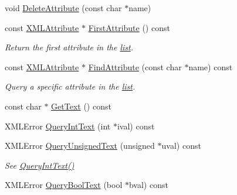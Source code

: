 \begin{DoxyCompactItemize}
void \hyperlink{classtinyxml2_1_1XMLElement_aebd45aa7118964c30b32fe12e944628a}{Delete\+Attribute} (const char $\ast$name)
\item 
\mbox{\label{classtinyxml2_1_1XMLElement_a3e191704c8d499906ec11fe2f60c6686}} 
const \hyperlink{classtinyxml2_1_1XMLAttribute}{X\+M\+L\+Attribute} $\ast$ \hyperlink{classtinyxml2_1_1XMLElement_a3e191704c8d499906ec11fe2f60c6686}{First\+Attribute} () const
\begin{DoxyCompactList}\small\item\em Return the first attribute in the \hyperlink{protocollist-p}{list}. \end{DoxyCompactList}\item 
\mbox{\label{classtinyxml2_1_1XMLElement_a2dcd4d5d6fb63396cd2f257c318b42c4}} 
const \hyperlink{classtinyxml2_1_1XMLAttribute}{X\+M\+L\+Attribute} $\ast$ \hyperlink{classtinyxml2_1_1XMLElement_a2dcd4d5d6fb63396cd2f257c318b42c4}{Find\+Attribute} (const char $\ast$name) const
\begin{DoxyCompactList}\small\item\em Query a specific attribute in the \hyperlink{protocollist-p}{list}. \end{DoxyCompactList}\item 
const char $\ast$ \hyperlink{classtinyxml2_1_1XMLElement_a6d5c8d115561ade4e4456b71d91b6f51}{Get\+Text} () const
\item 
X\+M\+L\+Error \hyperlink{classtinyxml2_1_1XMLElement_a926357996bef633cb736e1a558419632}{Query\+Int\+Text} (int $\ast$ival) const
\item 
\mbox{\label{classtinyxml2_1_1XMLElement_a14d38aa4b5e18a46274a27425188a6a1}} 
X\+M\+L\+Error \hyperlink{classtinyxml2_1_1XMLElement_a14d38aa4b5e18a46274a27425188a6a1}{Query\+Unsigned\+Text} (unsigned $\ast$uval) const
\begin{DoxyCompactList}\small\item\em See \hyperlink{classtinyxml2_1_1XMLElement_a926357996bef633cb736e1a558419632}{Query\+Int\+Text()} \end{DoxyCompactList}\item 
\mbox{\label{classtinyxml2_1_1XMLElement_a3fe5417d59eb8f5c4afe924b7d332736}} 
X\+M\+L\+Error \hyperlink{classtinyxml2_1_1XMLElement_a3fe5417d59eb8f5c4afe924b7d332736}{Query\+Bool\+Text} (bool $\ast$bval) const

\end{DoxyCompactItemize}
